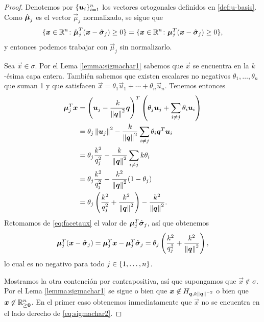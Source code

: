 \begin{proof}
	Denotemos por $\lbrace \boldsymbol{u}_i \rbrace_{i=1}^{n}$ los vectores ortogonales definidos en
	\eqref{def:u-basis}. Como $\hat{\boldsymbol{\mu}}_j$ es el vector $\vec{\mu}_j$ normalizado, se sigue que
	\begin{equation*}
		\lbrace  \boldsymbol{x} \in \mathbb{R}^n \colon \hat{\boldsymbol{\mu}}_j^T(\boldsymbol{x} - \hat{\boldsymbol{ \sigma }}_j) \geq 0 \rbrace
		=
		\lbrace  \boldsymbol{x} \in \mathbb{R}^n \colon \boldsymbol{\mu}_j^T(\boldsymbol{x} - \hat{\boldsymbol{ \sigma }}_j) \geq 0 \rbrace,
	\end{equation*}
	y entonces podemos trabajar con $\vec{\mu}_j$ sin normalizarlo. 

	Sea $\vec{x} \in \sigma$. Por el Lema \ref{lemma:sigmachar1} sabemos que
	$\vec{x}$ se encuentra en la $k$-ésima capa entera. También sabemos que existen escalares no
	negativos $\theta_1, \ldots, \theta_n$ que suman 1 y que satisfacen $\vec{x} = \theta_1\vec{u}_1
	+ \cdots + \theta_n\vec{u}_n$. Tenemos entonces
	\begin{align*}
		\boldsymbol{\mu}_j^T\boldsymbol{x}
		&=
		\left(\boldsymbol{u}_j - \frac{k}{\left\lVert \boldsymbol{q} \right\rVert^2}\boldsymbol{q}\right)^T
		\left(\theta_j\boldsymbol{u}_j + \sum_{i \neq j}\theta_i\boldsymbol{u}_i\right) \\
		&= \theta_j\left\lVert \boldsymbol{u}_j \right\rVert^2 - \frac{k}{\left\lVert \boldsymbol{q} \right\rVert^2}\sum_{i \neq j}
		\theta_i\boldsymbol{q}^T\boldsymbol{u}_i \\
		&= \theta_j\frac{k^2}{q_j^2} - \frac{k}{\left\lVert \boldsymbol{q} \right\rVert^2}\sum_{i \neq j}k\theta_i \\
		&= \theta_j\frac{k^2}{q_j^2} - \frac{k^2}{\left\lVert \boldsymbol{q} \right\rVert^2}(1 - \theta_j) \\
		&= \theta_j\left(\frac{k^2}{q_j^2} + \frac{k^2}{\left\lVert \boldsymbol{q} \right\rVert^2}\right)
		- \frac{k^2}{\left\lVert \boldsymbol{q} \right\rVert^2}.
	\end{align*}
	Retomamos de \eqref{eq:facetaux} el valor de $\boldsymbol{\mu}_j^T\hat{\boldsymbol{ \sigma }}_j$, así que obtenemos
	\begin{equation*}
		\boldsymbol{\mu}_j^T(\boldsymbol{x} - \hat{\boldsymbol{ \sigma }}_j)
		= 
		\boldsymbol{\mu}_j^T\boldsymbol{x} - \boldsymbol{\mu}_j^T\hat{\boldsymbol{ \sigma }}_j
		=
		\theta_j\left(\frac{k^2}{q_j^2} + \frac{k^2}{\left\lVert \boldsymbol{q} \right\rVert^2}\right),
	\end{equation*}
	lo cual es no negativo para todo $j \in \lbrace 1, \ldots, n \rbrace$.

	Mostramos la otra contención por contrapositiva, así que supongamos que $\vec{x} \not\in
	\sigma$. Por el Lema \ref{lemma:sigmachar1} se sigue o bien que $\boldsymbol{x} \not\in H_{\boldsymbol{q},
	k\left\lVert \boldsymbol{q} \right\rVert^{-2}}$ o bien que $\boldsymbol{x} \not\in \mathbb{R}^n_{\geq \boldsymbol{0}}$. En el primer caso
	obtenemos inmediatamente que $\vec{x}$ no se encuentra en el lado derecho de
	\eqref{eq:sigmachar2}.


\end{proof}
